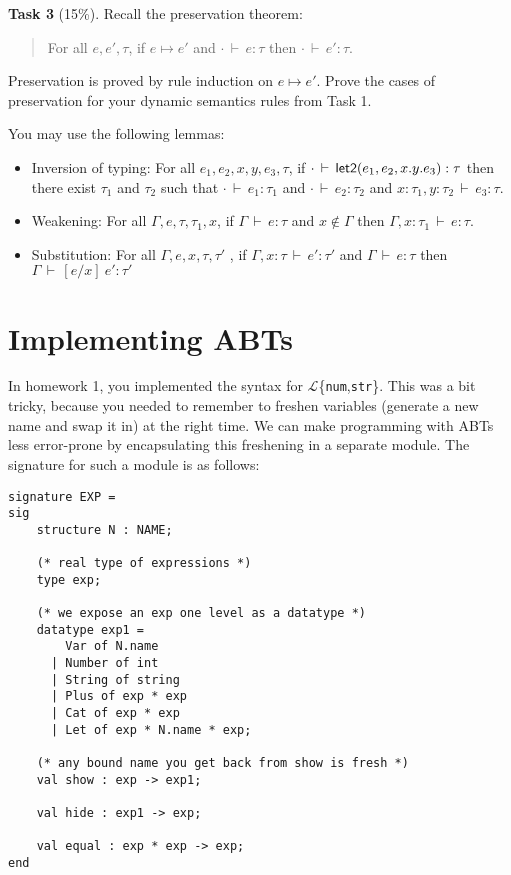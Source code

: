 \documentclass[11pt]{article}
\newcommand{\task}[2]
  {\bigskip \noindent
   {\bf Task #1} (#2\%).}
\newcommand{\EXP}[0]{$\mathcal{L}$\{\texttt{num},\texttt{str}\}}
\newcommand{\typeof}[3]{\ensuremath{#1 \, \vdash \, #2 : #3}}
\newcommand{\steps}[2]{\ensuremath{#1 \mapsto #2}}
\newcommand{\sub}[3]{\ensuremath{[#2 / #1]\ #3}}
\begin{document}
\task{3}{15} Recall the preservation theorem:
\begin{quote}
For all $e,e',\tau$, if \steps{e}{e'} and $\typeof{\cdot}{e}{\tau}$ then \typeof{\cdot}{e'}{\tau}.
\end{quote}
Preservation is proved by rule induction on \steps{e}{e'}.  Prove the
cases of preservation for your dynamic semantics rules from Task 1.

You may use the following lemmas:
\begin{itemize}
\item Inversion of typing:  For all $e_1,e_2,x,y,e_3,\tau$, 
if $\typeof{\cdot}{\lettwo{e_1}{e_2}{x}{y}{e_3}}{\tau}$ then 
there exist $\tau_1$ and $\tau_2$ such that 
$\typeof{\cdot}{e_1}{\tau_1}$
and $\typeof{\cdot}{e_2}{\tau_2}$
and $\typeof{x : \tau_1 , y : \tau_2}{e_3}{\tau}$.

\item Weakening: For all $\Gamma,e,\tau,\tau_1,x$, if \typeof{\Gamma}{e}{\tau}
  and $x \not \in \Gamma$ then \typeof{\Gamma,x:\tau_1}{e}{\tau}.


\item Substitution:
For all $\Gamma,e,x,\tau,\tau'$ , 
if \typeof{\Gamma,x:\tau}{e'}{\tau'} and \typeof{\Gamma}{e}{\tau}
then \typeof{\Gamma}{\sub{x}{e}{e'}}{\tau'}
\end{itemize}


\section{Implementing ABTs}

In homework 1, you implemented the syntax for \EXP.  This was a bit
tricky, because you needed to remember to freshen variables (generate a
new name and swap it in) at the right time.  We can make programming
with ABTs less error-prone by encapsulating this freshening in a
separate module.  The signature for such a module is as follows:

\begin{verbatim}
signature EXP = 
sig
    structure N : NAME;

    (* real type of expressions *)
    type exp;

    (* we expose an exp one level as a datatype *)
    datatype exp1 = 
        Var of N.name
      | Number of int
      | String of string
      | Plus of exp * exp
      | Cat of exp * exp
      | Let of exp * N.name * exp;

    (* any bound name you get back from show is fresh *)
    val show : exp -> exp1;

    val hide : exp1 -> exp;
        
    val equal : exp * exp -> exp;
end
\end{verbatim}
\end{document}

